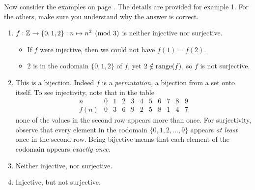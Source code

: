 Now consider the examples on page \pageref{ex:functmod1}. The details are provided for example 1. For the others, make sure you understand why the answer is correct. 
\begin{examples}{}{}
\begin{enumerate}
  \item $f:\mathbb{Z}\to\{0,1,2\}:n\mapsto n^2\pmod 3$ is neither injective nor surjective.
  	\begin{itemize}
  	  \item If $f$ were injective, then we could not have $f(1)=f(2)$.
  	  \item 2 is in the codomain $\{0,1,2\}$ of $f$, yet $2\notin\operatorname{range}(f)$, so $f$ is not surjective.
		\end{itemize}
  \item This is a bijection. Indeed $f$ is  a \emph{permutation,} a bijection from a set onto itself. To see injectivity, note that in the table
  \[\begin{array}{c|cccccccccc}
  n&0&1&2&3&4&5&6&7&8&9\\\hline
  f(n)&0&3&6&9&2&5&8&1&4&7
  \end{array}\]
  none of the values in the second row appears more than once. For surjectivity, observe that every element in the codomain $\{0,1,2,\ldots,9\}$ appears \emph{at least} once in the second row. Being bijective means that each element of the codomain appears \emph{exactly once.}
  \item Neither injective, nor surjective.
  \item Injective, but not surjective.
\end{enumerate}
\end{examples}


